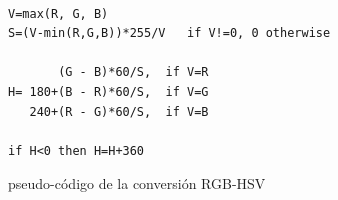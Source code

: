 
\begin{figure}[tpb]
\begin{center}
\begin{verbatim}

V=max(R, G, B)
S=(V-min(R,G,B))*255/V   if V!=0, 0 otherwise

       (G - B)*60/S,  if V=R
H= 180+(B - R)*60/S,  if V=G
   240+(R - G)*60/S,  if V=B

if H<0 then H=H+360
\end{verbatim}

\caption[Conversi\'on RGB-HSV]{\label{code:hsv}pseudo-c\'odigo de la conversi\'on RGB-HSV}
\end{center}
\end{figure}

